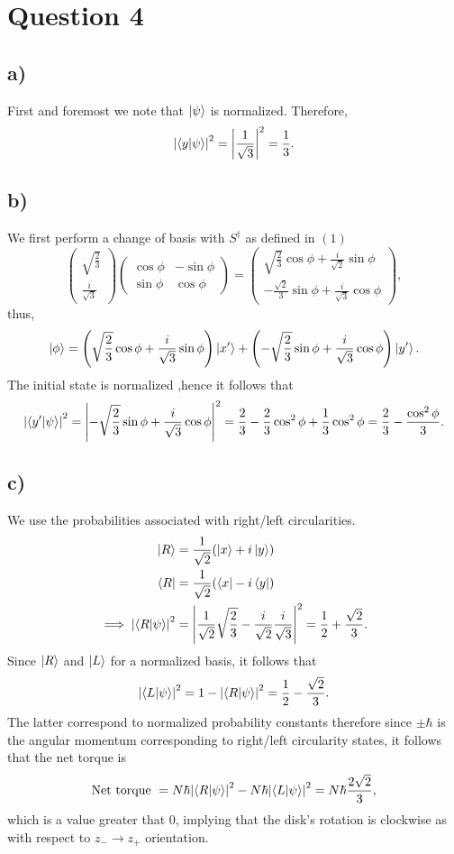 \documentclass[
	12pt,
	]{article}
\theoremstyle{definition}
\theoremstyle{definition}
\theoremstyle{definition}
\theoremstyle{definition}
\theoremstyle{definition}
\theoremstyle{example}
\theoremstyle{note}
\theoremstyle{remark}
\theoremstyle{example}
\begin{document}
	\section*{Question 4}
		\subsection*{a) }
			First and foremost we note that $\ket{\psi}$ is normalized. Therefore, 
			$$ \abs{\braket{y}{\psi}}^{2} = \abs{\frac{1}{\sqrt{3}}}^{2} = \frac13.$$
		\subsection*{b) }
			We first perform a change of basis with $S^{\dagger}$ as defined in $(1)$
			$$ \begin{pmatrix}
			\sqrt{\frac{2}{3}} \\ \frac{i}{\sqrt{3}}\end{pmatrix} \begin{pmatrix}
				\cos \phi & -\sin\phi \\ \sin \phi & \cos \phi 
			\end{pmatrix} = \begin{pmatrix}
				 \sqrt{\frac{2}{3}} \cos \phi + \frac{i}{\sqrt{2}} \sin \phi \\
				 - \frac{\sqrt{2}}{3} \sin \phi + \frac{i}{\sqrt{3}} \cos \phi 
			\end{pmatrix},$$
			thus, 
			$$ \ket{\phi } = \left(\sqrt{\frac{2}{3}}\cos \phi + \frac{i}{\sqrt{3}} \sin \phi \right)\ket{x'} + \left(-\sqrt{\frac{2}{3}}\sin \phi + \frac{i}{\sqrt{3}} \cos \phi\right)\ket{y'}.$$
			The initial state is normalized ,hence it follows that 
			$$ \abs{\braket{y'}{\psi}}^{2} = \abs{- \sqrt{\frac{2}{3}} \sin \phi + \frac{i}{\sqrt{3}}\cos \phi}^{2} = \frac23 - \frac{2}{3} \cos^{2} \phi + \frac{1}{3} \cos^{2}\phi = \frac23 - \frac{\cos^{2} \phi}{3}.$$
		\subsection*{c) }
			We use the probabilities associated with right/left circularities.
			\begin{align*}
				\ket{R} &= \frac{1}{\sqrt{2}} (\ket{x} + i \ket{y}) \\
				\bra{R} &= \frac{1}{\sqrt{2}} (\bra{x} - i \bra{y}) \\
				\implies \abs{\braket{R}{\psi}}^{2} &= \abs{\frac{1}{\sqrt{2}} \sqrt{\frac{2}{3}} - \frac{i}{\sqrt{2}} \frac{i}{\sqrt{3}}}^{2} =\frac12 + \frac{\sqrt{2}}{3}.
			\end{align*}
			Since $\ket{R}$ and $\ket{L}$ for a normalized basis, it follows that 
			$$ \abs{\braket{L}{\psi}}^{2} = 1 - \abs{\braket{R}{\psi}}^{2} = \frac12 - \frac{\sqrt{2}}{3}.$$
			The latter correspond to normalized probability constants therefore since $\pm \hbar$ is the angular momentum corresponding to right/left circularity states, it follows that the net torque is 
			$$ \text{Net torque } = N \hbar\abs{\braket{R}{\psi}}^{2} - N \hbar \abs{\braket{L}{\psi}}^{2} = N \hbar \frac{2\sqrt{2}}{3},$$
			which is a value greater that $0$, implying that the disk's rotation is clockwise as with respect to $z_{-} \to z_{+}$ orientation. 
\end{document}
